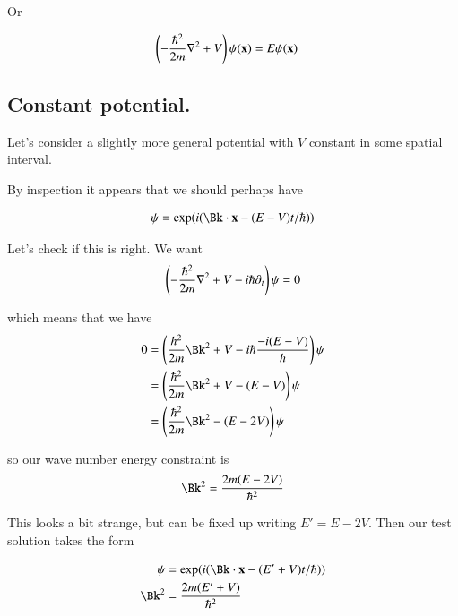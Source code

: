 \documentclass{article}
\begin{document}
Or

\begin{align*}
\left(-\frac{\hbar^2}{2m}\nabla^2 + V\right) \psi(\mathbf{x}) &= E\psi(\mathbf{x})
\end{align*}


\subsection{ Constant potential. }

Let's consider a slightly more general potential with $V$ constant in some spatial interval.

By inspection it appears that we should perhaps have

\begin{align*}
\psi &= \exp(i(\Bk \cdot \Bx - (E - V) t/\hbar)) \\
\end{align*}

Let's check if this is right.  We want 
\begin{align*}
\left(-\frac{\hbar^2}{2m}\nabla^2 + V -i\hbar \partial_t\right)\psi = 0
\end{align*}

which means that we have
\begin{align*}
0 &=
\left(\frac{\hbar^2}{2m}\Bk^2 + V -i\hbar \frac{-i(E - V)}{\hbar}\right)\psi \\
&= \left(\frac{\hbar^2}{2m}\Bk^2 + V -(E - V)\right)\psi \\
&= \left(\frac{\hbar^2}{2m}\Bk^2 - (E - 2V)\right)\psi \\
\end{align*}

so our wave number energy constraint is
\begin{align*}
\Bk^2 = \frac{2 m (E - 2V)}{\hbar^2}
\end{align*}

This looks a bit strange, but can be fixed up writing $E' = E - 2V$.  Then our test solution takes the form

\begin{align*}
\psi &= \exp(i(\Bk \cdot \Bx - (E' + V) t/\hbar)) \\
\Bk^2 &= \frac{2 m (E' + V)}{\hbar^2}
\end{align*}
\end{document}
